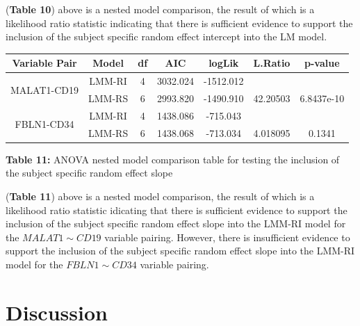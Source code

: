 \documentclass[12pt,]{article}
\begin{document}
(\textbf{Table 10}) above is a nested model comparison, the result of
which is a likelihood ratio statistic indicating that there is
sufficient evidence to support the inclusion of the subject specific
random effect intercept into the LM model.

\vspace{15pt}

\begin{center}
\begin{tabular}{|c|c|c|c|c|c|c|}
\hline
Variable Pair & Model & df & AIC & logLik & L.Ratio & p-value \\
\hline
\hline
\multirow{2}{*}{MALAT1-CD19} & LMM-RI & 4 & 3032.024 & -1512.012 &  & \\
 & LMM-RS & 6 & 2993.820 & -1490.910 & 42.20503 & 6.8437e-10  \\
\hline
\hline
\multirow{2}{*}{FBLN1-CD34} & LMM-RI & 4 & 1438.086 & -715.043 &  & \\
 & LMM-RS & 6 & 1438.068 & -713.034 & 4.018095 & 0.1341  \\
\hline
\end{tabular}

\vspace{5pt}

\textbf{Table 11:} ANOVA nested model comparison table for testing the inclusion of the subject specific random effect slope
\end{center}

(\textbf{Table 11}) above is a nested model comparison, the result of
which is a likelihood ratio statistic idicating that there is sufficient
evidence to support the inclusion of the subject specific random effect
slope into the LMM-RI model for the \(MALAT1 \sim CD19\) variable
pairing. However, there is insufficient evidence to support the
inclusion of the subject specific random effect slope into the LMM-RI
model for the \(FBLN1 \sim CD34\) variable pairing.

\hypertarget{discussion}{%
\section{Discussion}\label{discussion}}
\end{document}
